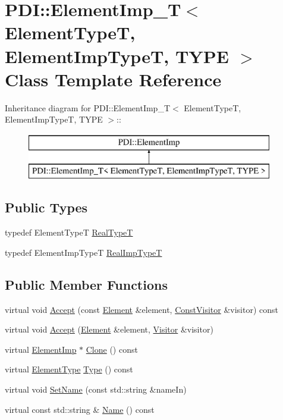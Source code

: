\hypertarget{class_p_d_i_1_1_element_imp___t}{
\section{PDI::ElementImp\_\-T$<$ ElementTypeT, ElementImpTypeT, TYPE $>$ Class Template Reference}
\label{class_p_d_i_1_1_element_imp___t}
}
Inheritance diagram for PDI::ElementImp\_\-T$<$ ElementTypeT, ElementImpTypeT, TYPE $>$::\begin{figure}[H]
\begin{center}
\leavevmode
\includegraphics[height=2cm]{class_p_d_i_1_1_element_imp___t}
\end{center}
\end{figure}
\subsection*{Public Types}
\begin{CompactItemize}
\item 
typedef ElementTypeT \hyperlink{class_p_d_i_1_1_element_imp___t_3db9ff9c897057a35a0652bf5045488e}{RealTypeT}
\item 
typedef ElementImpTypeT \hyperlink{class_p_d_i_1_1_element_imp___t_d8693ec6dc2ab357299fd989b0ac532d}{RealImpTypeT}
\end{CompactItemize}
\subsection*{Public Member Functions}
\begin{CompactItemize}
\item 
virtual void \hyperlink{class_p_d_i_1_1_element_imp___t_e3290d73bffe4f6d3e5c31ed13ec217a}{Accept} (const \hyperlink{class_p_d_i_1_1_element}{Element} \&element, \hyperlink{class_p_d_i_1_1_const_visitor}{ConstVisitor} \&visitor) const 
\item 
virtual void \hyperlink{class_p_d_i_1_1_element_imp___t_69151861ad5ad48355c81810f0d5b95b}{Accept} (\hyperlink{class_p_d_i_1_1_element}{Element} \&element, \hyperlink{class_p_d_i_1_1_visitor}{Visitor} \&visitor)
\item 
virtual \hyperlink{class_p_d_i_1_1_element_imp}{ElementImp} $\ast$ \hyperlink{class_p_d_i_1_1_element_imp___t_5b9c768557a43a6a352db1660df50e04}{Clone} () const 
\item 
virtual \hyperlink{namespace_p_d_i_bbd28c6f8905ff6834d6f84ba4363e5e}{ElementType} \hyperlink{class_p_d_i_1_1_element_imp___t_23d3df9b834aecb1fa3afba5ebd4ae66}{Type} () const 
\item 
virtual void \hyperlink{class_p_d_i_1_1_element_imp___t_6faa00112b7690d462881ba5863c214f}{SetName} (const std::string \&nameIn)
\item 
virtual const std::string \& \hyperlink{class_p_d_i_1_1_element_imp___t_b1d86a7e12685823023fa2dc11d36f02}{Name} () const 
\end{CompactItemize}
